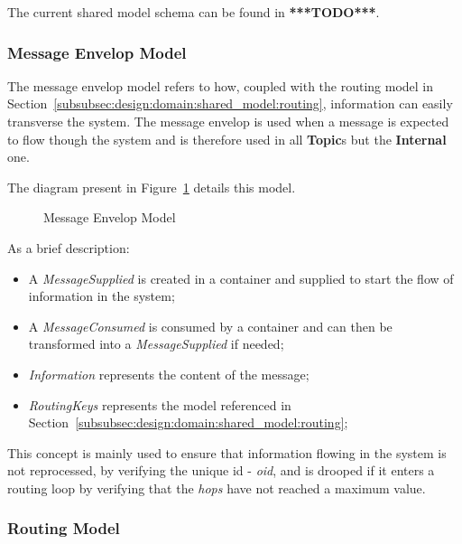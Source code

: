The current shared model schema can be found in \textbf{***TODO***}.

\subsubsection*{Message Envelop Model}
\label{subsubsec:design:domain:shared_model:message}

The message envelop model refers to how, coupled with the routing model in Section~\ref{subsubsec:design:domain:shared_model:routing}, information can easily transverse the system.
The message envelop is used when a message is expected to flow though the system and is therefore used in all \textbf{Topic}s but the \textbf{Internal} one.

The diagram present in Figure~\ref{fig:design:domain:shared_model:messsage:diagram} details this model.

\begin{figure}[H]
   \centering
  \resizebox{\columnwidth}{!}
  {
     
  }
  \caption[Message Envelop Model]{Message Envelop Model}
  \label{fig:design:domain:shared_model:messsage:diagram}
\end{figure}

As a brief description:

\begin{itemize}
   \item A \textit{MessageSupplied} is created in a container and supplied to start the flow of information in the system;
   \item A \textit{MessageConsumed} is consumed by a container and can then be transformed into a \textit{MessageSupplied} if needed;
   \item \textit{Information} represents the content of the message;
   \item \textit{RoutingKeys} represents the model referenced in Section~\ref{subsubsec:design:domain:shared_model:routing};
\end{itemize}

This concept is mainly used to ensure that information flowing in the system is not reprocessed, by verifying the unique id - \textit{oid}, and is drooped if it enters a routing loop by verifying that the \textit{hops} have not reached a maximum value.  

\subsubsection*{Routing Model}
\label{subsubsec:design:domain:shared_model:routing}

